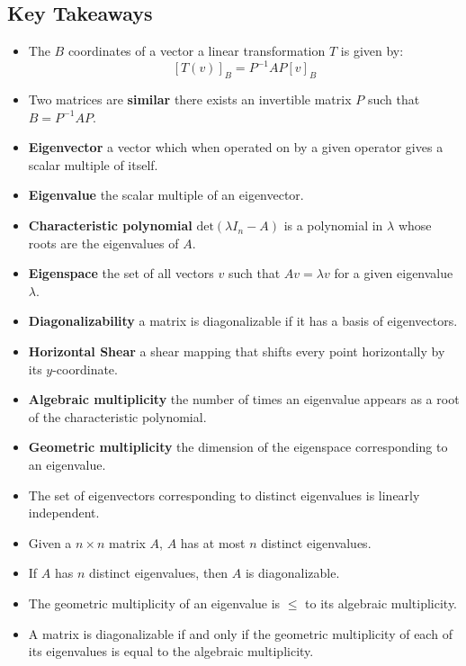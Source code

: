 \documentclass[a4paper, 9pt]{extarticle}
\begin{document}
\subsection{Key Takeaways}
\begin{takeaway-box}{}{}
\begin{itemize}
  \item The $B$ coordinates of a vector a linear transformation $T$ is given by:
        $$[T(v)]_B = P^{-1}AP[v]_B$$
  \item Two matrices are \textbf{similar} there exists an invertible matrix $P$ such that $B = P^{-1}AP$.
  \item \textbf{Eigenvector} a vector which when operated on by a given operator gives a scalar multiple of itself.
  \item \textbf{Eigenvalue} the scalar multiple of an eigenvector.
  \item \textbf{Characteristic polynomial} $\text{det}(\lambda I_n - A)$ is a polynomial in $\lambda$ whose roots are the eigenvalues of $A$.
  \item \textbf{Eigenspace} the set of all vectors $v$ such that $Av = \lambda v$ for a given eigenvalue $\lambda$.
  \item \textbf{Diagonalizability} a matrix is diagonalizable if it has a basis of eigenvectors.
  \item \textbf{Horizontal Shear} a shear mapping that shifts every point horizontally by its $y$-coordinate.
  \item \textbf{Algebraic multiplicity} the number of times an eigenvalue appears as a root of the characteristic polynomial.
  \item \textbf{Geometric multiplicity} the dimension of the eigenspace corresponding to an eigenvalue.
  \item The set of eigenvectors corresponding to distinct eigenvalues is linearly independent.
  \item Given a $n \times n$ matrix $A$, $A$ has at most $n$ distinct eigenvalues.
  \item If $A$ has $n$ distinct eigenvalues, then $A$ is diagonalizable.
  \item The geometric multiplicity of an eigenvalue is $\leq$ to its algebraic multiplicity.
  \item A matrix is diagonalizable if and only if the geometric multiplicity of each of its eigenvalues is equal to the algebraic multiplicity.
\end{itemize}
\end{takeaway-box}
\end{document}
